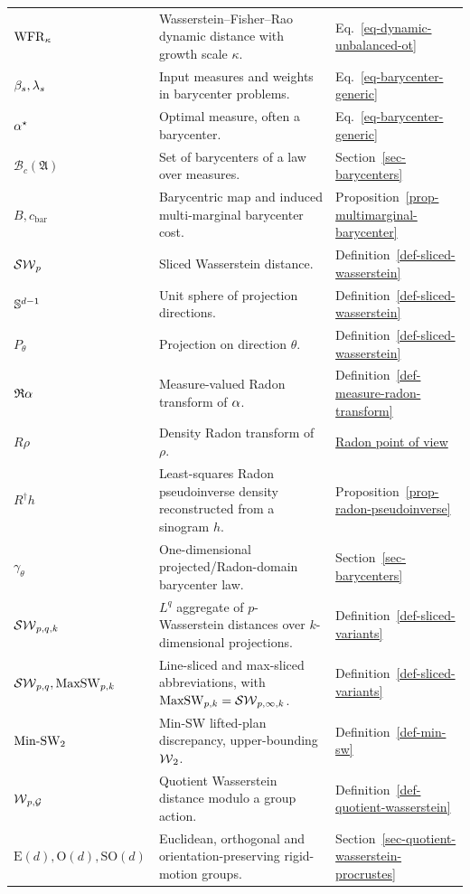 {\begin{longtable}{>{\raggedright\arraybackslash}p{}
                  >{\raggedright\arraybackslash}p{}
                  >{\raggedright\arraybackslash}p{}}
$\operatorname{WFR}_\kappa$ & Wasserstein--Fisher--Rao dynamic distance with growth scale $\kappa$. & Eq.~\eqref{eq-dynamic-unbalanced-ot} \\
$\beta_s,\lambda_s$ & Input measures and weights in barycenter problems. & Eq.~\eqref{eq-barycenter-generic} \\
$\alpha^\star$ & Optimal measure, often a barycenter. & Eq.~\eqref{eq-barycenter-generic} \\
$\mathcal B_c(\mathfrak A)$ & Set of barycenters of a law over measures. & Section~\ref{sec-barycenters} \\
$B,c_{\mathrm{bar}}$ & Barycentric map and induced multi-marginal barycenter cost. & Proposition~\ref{prop-multimarginal-barycenter} \\
$\operatorname{\mathcal{SW}}_p$ & Sliced Wasserstein distance. & Definition~\ref{def-sliced-wasserstein} \\
$\mathbb{S}^{d-1}$ & Unit sphere of projection directions. & Definition~\ref{def-sliced-wasserstein} \\
$P_\theta$ & Projection on direction $\theta$. & Definition~\ref{def-sliced-wasserstein} \\
$\mathfrak R\alpha$ & Measure-valued Radon transform of $\alpha$. & Definition~\ref{def-measure-radon-transform} \\
$R\rho$ & Density Radon transform of $\rho$. & \hyperref[rem-sliced-radon-viewpoint]{Radon point of view} \\
$R^\dagger h$ & Least-squares Radon pseudoinverse density reconstructed from a sinogram $h$. & Proposition~\ref{prop-radon-pseudoinverse} \\
$\gamma_\theta$ & One-dimensional projected/Radon-domain barycenter law. & Section~\ref{sec-barycenters} \\
$\operatorname{\mathcal{SW}}_{p,q,k}$ & $L^q$ aggregate of $p$-Wasserstein distances over $k$-dimensional projections. & Definition~\ref{def-sliced-variants} \\
$\operatorname{\mathcal{SW}}_{p,q},\operatorname{MaxSW}_{p,k}$ & Line-sliced and max-sliced abbreviations, with $\operatorname{MaxSW}_{p,k}=\operatorname{\mathcal{SW}}_{p,\infty,k}$. & Definition~\ref{def-sliced-variants} \\
$\operatorname{Min\text{-}SW}_2$ & Min-SW lifted-plan discrepancy, upper-bounding $\operatorname{\mathcal{W}}_2$. & Definition~\ref{def-min-sw} \\
$\operatorname{\mathcal{W}}_{p,\mathcal G}$ & Quotient Wasserstein distance modulo a group action. & Definition~\ref{def-quotient-wasserstein} \\
$\mathrm E(d),\mathrm O(d),\mathrm{SO}(d)$ & Euclidean, orthogonal and orientation-preserving rigid-motion groups. & Section~\ref{sec-quotient-wasserstein-procrustes} \\

\end{longtable}}

